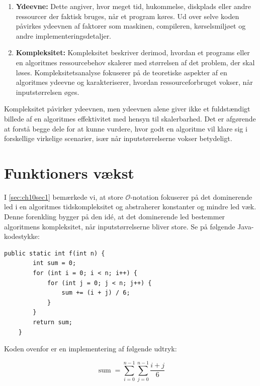 \begin{enumerate}
    \item \textbf{Ydeevne:} Dette angiver, hvor meget tid, hukommelse, diskplads eller andre ressourcer der faktisk bruges, når et program køres. Ud over selve koden påvirkes ydeevnen af faktorer som maskinen, compileren, kørselsmiljøet og andre implementeringsdetaljer.
    \item \textbf{Kompleksitet:} Kompleksitet beskriver derimod, hvordan et programs eller en algoritmes ressourcebehov skalerer med størrelsen af det problem, der skal løses. Kompleksitetsanalyse fokuserer på de teoretiske aspekter af en algoritmes ydeevne og karakteriserer, hvordan ressourceforbruget vokser, når inputstørrelsen øges.
\end{enumerate}

Kompleksitet påvirker ydeevnen, men ydeevnen alene giver ikke et fuldstændigt billede af en algoritmes effektivitet med hensyn til skalerbarhed. Det er afgørende at forstå begge dele for at kunne vurdere, hvor godt en algoritme vil klare sig i forskellige virkelige scenarier, især når inputstørrelserne vokser betydeligt.

\section{Funktioners vækst}
I \autoref{sec:ch10sec1} bemærkede vi, at store $\mathcal{O}$-notation fokuserer på det dominerende led i en algoritmes tidskompleksitet og abstraherer konstanter og mindre led væk. Denne forenkling bygger på den idé, at det dominerende led bestemmer algoritmens kompleksitet, når inputstørrelserne bliver store. Se på følgende Java-kodestykke:

\newpage

\begin{lstlisting}[style=javaStyle, caption={SumCalculator i Java}, label={lst:java_f_function}]
    public static int f(int n) {
        int sum = 0;
        for (int i = 0; i < n; i++) {
            for (int j = 0; j < n; j++) {
                sum += (i + j) / 6;
            }
        }
        return sum;
    }
\end{lstlisting}

Koden ovenfor er en implementering af følgende udtryk:

\[
\operatorname{sum}=\sum_{i=0}^{n-1} \sum_{j=0}^{n-1} \frac{i+j}{6}
\]

